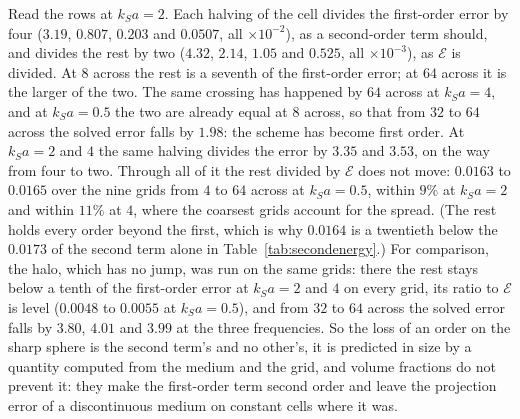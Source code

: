 \documentclass[11pt,a4paper]{article}
\newcommand{\cE}{\mathcal{E}}
\begin{document}
Read the rows at $k_Sa=2$. Each halving of the cell divides the first-order error by four ($3.19$, $0.807$,
$0.203$ and $0.0507$, all $\times10^{-2}$), as a second-order term should, and divides the rest by two
($4.32$, $2.14$, $1.05$ and $0.525$, all $\times10^{-3}$), as $\cE$ is divided. At $8$ across the rest
is a seventh of the first-order error; at $64$ across it is the larger of the two. The same crossing has
happened by $64$ across at $k_Sa=4$, and at $k_Sa=0.5$ the two are already equal at $8$ across, so that
from $32$ to $64$ across the solved error falls by $1.98$: the scheme has become first order. At $k_Sa=2$ and $4$ the same halving
divides the error by $3.35$ and $3.53$, on the way from four to two. Through all of it the rest divided
by $\cE$ does not move: $0.0163$ to $0.0165$ over the nine grids from $4$ to $64$ across at $k_Sa=0.5$,
within $9\%$ at $k_Sa=2$ and within $11\%$ at $4$, where the coarsest grids account for the spread. (The
rest holds every order beyond the first, which is why $0.0164$ is a twentieth below the $0.0173$ of the
second term alone in Table~\ref{tab:secondenergy}.) For comparison, the halo, which has no jump, was run
on the same grids: there the rest stays below a tenth of the first-order error at $k_Sa=2$ and $4$
on every grid, its ratio to $\cE$ is level ($0.0048$ to $0.0055$ at $k_Sa=0.5$), and from $32$ to $64$
across the solved error falls by $3.80$, $4.01$ and $3.99$ at the three frequencies. So the loss of an order on the sharp sphere is
the second term's and no other's, it is predicted in size by a quantity computed from the medium and the
grid, and volume fractions do not prevent it: they make the first-order term second order and leave the
projection error of a discontinuous medium on constant cells where it was.
\end{document}
